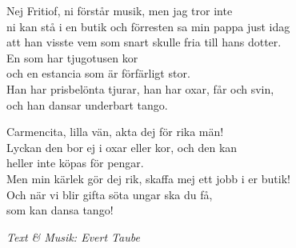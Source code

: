 Nej Fritiof, ni förstår musik, men jag tror inte\\
ni kan stå i en butik och förresten sa min pappa just idag\\
att han visste vem som snart skulle fria till hans dotter.\\
En som har tjugotusen kor\\
och en estancia som är förfärligt stor.\\
Han har prisbelönta tjurar, han har oxar, får och svin,\\
och han dansar underbart tango.\par
\vspace{10pt}
Carmencita, lilla vän, akta dej för rika män!\\
Lyckan den bor ej i oxar eller kor, och den kan\\
heller inte köpas för pengar.\\
Men min kärlek gör dej rik, skaffa mej ett jobb i er butik!\\
Och när vi blir gifta söta ungar ska du få,\\
som kan dansa tango!
\par
\vspace{10pt}
{\footnotesize\textit{Text \& Musik: Evert Taube}}
